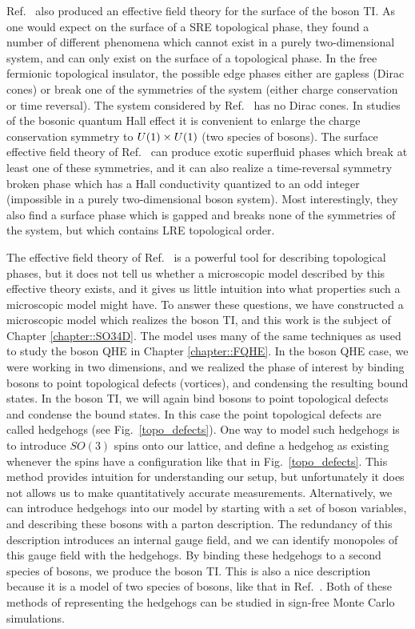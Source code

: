 Ref.~\cite{SenthilVishwanath} also produced an effective field theory for the surface of the boson TI. As one would expect on the surface of a SRE topological phase, they found a number of different phenomena which cannot exist in a purely two-dimensional system, and can only exist on the surface of a topological phase. In the free fermionic topological insulator, the possible edge phases either are gapless (Dirac cones) or break one of the symmetries of the system (either charge conservation or time reversal). The system considered by Ref.~\cite{SenthilVishwanath} has no Dirac cones. In studies of the bosonic quantum Hall effect it is convenient to enlarge the charge conservation symmetry to $U(1)\times U(1)$ (two species of bosons). The surface effective field theory of Ref.~\cite{SenthilVishwanath} can produce exotic superfluid phases which break at least one of these symmetries, and it can also realize a time-reversal symmetry broken phase which has a Hall conductivity quantized to an odd integer (impossible in a purely two-dimensional boson system). Most interestingly, they also find a surface phase which is gapped and breaks none of the symmetries of the system, but which contains LRE topological order.

The effective field theory of Ref.~\cite{SenthilVishwanath} is a powerful tool for describing topological phases, but it does not tell us whether a microscopic model described by this effective theory exists, and it gives us little intuition into what properties such a microscopic model might have. To answer these questions, we have constructed a microscopic model which realizes the boson TI, and this work is the subject of Chapter \ref{chapter::SO34D}.
The model uses many of the same techniques as used to study the boson QHE in Chapter \ref{chapter::FQHE}. In the boson QHE case, we were working in two dimensions, and we realized the phase of interest by binding bosons to point topological defects (vortices), and condensing the resulting bound states. In the boson TI, we will again bind bosons to point topological defects and condense the bound states. In this case the point topological defects are called hedgehogs (see Fig.~\ref{topo_defects}). One way to model such hedgehogs is to introduce $SO(3)$ spins onto our lattice, and define a hedgehog as existing whenever the spins have a configuration like that in Fig.~\ref{topo_defects}. This method provides intuition for understanding our setup, but unfortunately it does not allows us to make quantitatively accurate measurements. Alternatively, we can introduce hedgehogs into our model by starting with a set of boson variables, and describing these bosons with a parton description. The redundancy of this description introduces an internal gauge field, and we can identify monopoles of this gauge field with the hedgehogs. By binding these hedgehogs to a second species of bosons, we produce the boson TI. This is also a nice description because it is a model of two species of bosons, like that in Ref.~\cite{SenthilVishwanath}. Both of these methods of representing the hedgehogs can be studied in sign-free Monte Carlo simulations.

